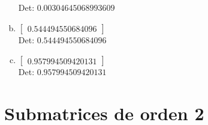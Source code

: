 \documentclass[12pt]{article}
\begin{document}
\begin{enumerate}[a)]
Det: $0.00304645068993609$\\

\item $\displaystyle \left[\begin{matrix}0.544494550684096\end{matrix}\right]$\\

Det: $0.544494550684096$\\

\item $\displaystyle \left[\begin{matrix}0.957994509420131\end{matrix}\right]$\\

Det: $0.957994509420131$\\

\end{enumerate}


\section*{Submatrices de orden 2}
\end{document}
